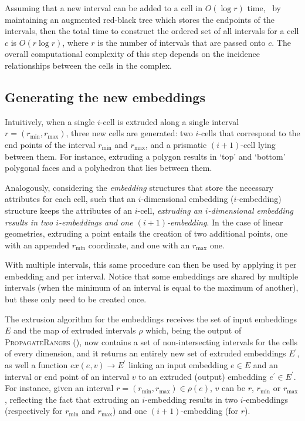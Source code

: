 Assuming that a new interval can be added to a cell in $O(\log r)$ time, \eg\ by maintaining an augmented red-black tree which stores the endpoints of the intervals, then the total time to construct the ordered set of all intervals for a cell $c$ is $O(r \log r)$, where $r$ is the number of intervals that are passed onto $c$.
The overall computational complexity of this step depends on the incidence relationships between the cells in the complex.

\subsection{Generating the new embeddings}
\label{ss:embeddings}

Intuitively, when a single $i$-cell is extruded along a single interval $r = (r_{\min}, r_{\max})$, three new cells are generated: two $i$-cells that correspond to the end points of the interval $r_{\min}$ and $r_{\max}$, and a prismatic $(i+1)$-cell lying between them.
For instance, extruding a polygon results in `top' and `bottom' polygonal faces and a polyhedron that lies between them.

Analogously, considering the \emph{embedding} structures that store the necessary attributes for each cell, such that an $i$-dimensional embedding ($i$-embedding) structure keeps the attributes of an $i$-cell, \emph{extruding an $i$-dimensional embedding results in two $i$-embeddings and one $(i+1)$-embedding}.
In the case of linear geometries, extruding a point entails the creation of two additional points, one with an appended $r_{\min}$ coordinate, and one with an $r_{\max}$ one.

With multiple intervals, this same procedure can then be used by applying it per embedding and per interval.
Notice that some embeddings are shared by multiple intervals (when the minimum of an interval is equal to the maximum of another), but these only need to be created once.

The extrusion algorithm for the embeddings receives the set of input embeddings $E$ and the map of extruded intervals $\rho$ which, being the output of \textsc{PropagateRanges} (), now contains a set of non-intersecting intervals for the cells of every dimension, and it returns an entirely new set of extruded embeddings $E^{\prime}$, as well a function $ex(e, v) \rightarrow E^\prime$ linking an input embedding $e \in E$ and an interval or end point of an interval $v$ to an extruded (output) embedding $e^{\prime} \in E^{\prime}$.
For instance, given an interval $r = (r_{\min}, r_{\max}) \in \rho(e)$, $v$ can be $r$, $r_{\min}$ or $r_{\max}$, reflecting the fact that extruding an $i$-embedding results in two $i$-embeddings (respectively for $r_{\min}$ and $r_{\max}$) and one $(i+1)$-embedding (for $r$).

